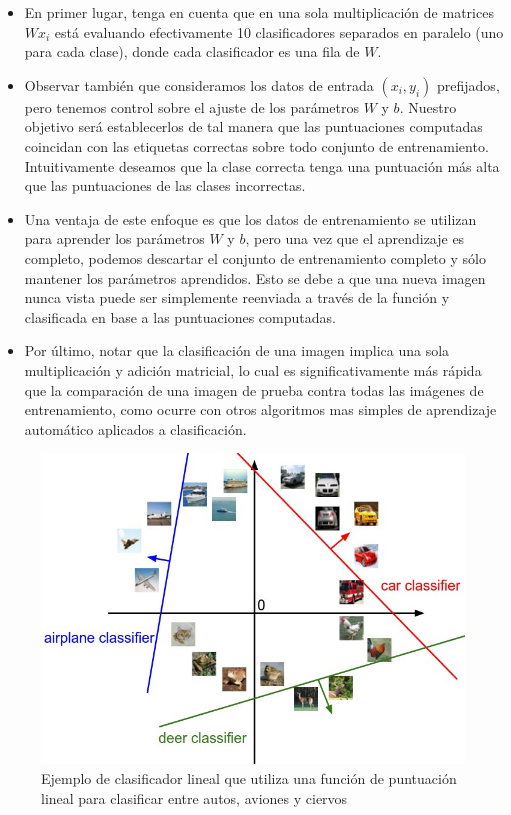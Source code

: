 \documentclass[a4paper,11pt,spanish]{book}
\begin{document}
	  \begin{itemize}
	   \item En primer lugar, tenga en cuenta que en una sola multiplicación de matrices $Wx_{i}$ está evaluando efectivamente 10 clasificadores separados en paralelo (uno para cada clase), 
	      donde cada clasificador es una fila de $W$.
	   \item Observar también que consideramos los datos de entrada $(x_{i}, y_{i})$  prefijados, pero tenemos control sobre el ajuste de los parámetros $W$ y $b$. 
		 Nuestro objetivo será establecerlos de tal manera que las puntuaciones computadas coincidan con las etiquetas correctas sobre todo conjunto de entrenamiento. 
		 Intuitivamente deseamos que la clase correcta tenga una puntuación más alta que las puntuaciones de las clases incorrectas.
	   \item Una ventaja de este enfoque es que los datos de entrenamiento se utilizan para aprender los parámetros $W$ y $b$, pero una vez que el aprendizaje es completo, 
		podemos descartar el conjunto de entrenamiento completo y sólo mantener los parámetros aprendidos. Esto se debe a que una nueva imagen nunca vista puede ser 
		simplemente reenviada a través de la función y clasificada en base a las puntuaciones computadas.
	  \item Por último, notar que la clasificación de una imagen implica una sola multiplicación y adición matricial, lo cual es significativamente más rápida que la comparación 
		de una imagen de prueba contra todas las imágenes de entrenamiento, como ocurre con otros algoritmos mas simples de aprendizaje automático aplicados a clasificación.
	  \end{itemize}
	  \begin{figure}[h]
	    \includegraphics[scale=0.5]{./img/stanford_linear_class.jpeg}
	    \caption{Ejemplo de clasificador lineal que utiliza una función de puntuación lineal para clasificar entre autos, aviones y ciervos}
	    \label{fig:figure2}
	  \end{figure}
	  
\end{document}
